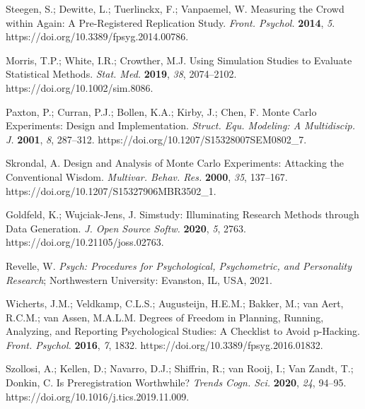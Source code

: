 \documentclass[psych,tutorial,accept,moreauthors,pdftex]{Definitions/mdpi}
\begin{document}
\begin{thebibliography}{999}
Steegen, S.; Dewitte, L.; Tuerlinckx, F.; Vanpaemel, W. Measuring the Crowd within Again: A Pre-Registered Replication Study. \emph{Front. Psychol.} \textbf{2014}, \emph{5}. https://doi.org/10.3389/fpsyg.2014.00786.


Morris, T.P.; White, I.R.; Crowther, M.J. Using Simulation Studies to Evaluate Statistical Methods. \emph{Stat. Med.} \textbf{2019}, \emph{38}, 2074--2102. https://doi.org/10.1002/sim.8086.


Paxton, P.; Curran, P.J.; Bollen, K.A.; Kirby, J.; Chen, F. Monte Carlo Experiments: Design and Implementation. \emph{Struct. Equ. Modeling: A Multidiscip. J.} \textbf{2001}, \emph{8}, 287--312. https://doi.org/10.1207/S15328007SEM0802\_7.


Skrondal, A. Design and Analysis of Monte Carlo Experiments: Attacking the Conventional Wisdom. \emph{Multivar. Behav. Res.} \textbf{2000}, \emph{35}, 137--167. https://doi.org/10.1207/S15327906MBR3502\_1.


Goldfeld, K.; Wujciak-Jens, J. Simstudy: Illuminating Research Methods through Data Generation. \emph{J. Open Source Softw.} \textbf{2020}, \emph{5}, 2763. https://doi.org/10.21105/joss.02763.

Revelle, W. \emph{Psych: Procedures for Psychological, Psychometric, and Personality Research}; Northwestern University: Evanston, IL, USA, 2021.

Wicherts, J.M.; Veldkamp, C.L.S.; Augusteijn, H.E.M.; Bakker, M.; van Aert, R.C.M.; van Assen, M.A.L.M. Degrees of Freedom in Planning, Running, Analyzing, and Reporting Psychological Studies: A Checklist to Avoid p-Hacking. \emph{Front. Psychol.} \textbf{2016}, \emph{7}, 1832. https://doi.org/10.3389/fpsyg.2016.01832.

Szollosi, A.; Kellen, D.; Navarro, D.J.; Shiffrin, R.; van Rooij, I.; Van Zandt, T.; Donkin, C. Is Preregistration Worthwhile? \emph{Trends Cogn. Sci.} \textbf{2020}, \emph{24}, 94--95. https://doi.org/10.1016/j.tics.2019.11.009.



\end{thebibliography}
\end{document}
